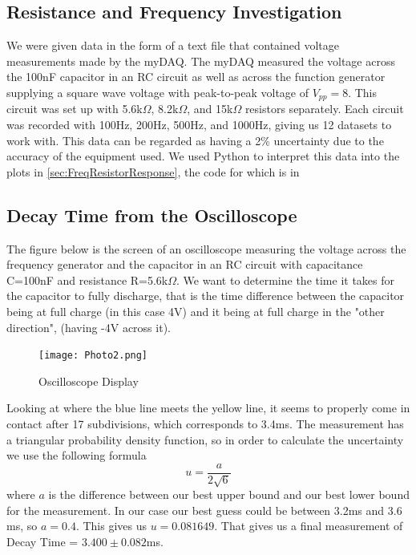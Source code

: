 \documentclass[12pt]{article}
\numberwithin{equation}{section}
\numberwithin{figure}{section}
\begin{document}
    \subsection{Resistance and Frequency Investigation}
    We were given data in the form of a text file that contained voltage measurements made by the myDAQ. 
    The myDAQ measured the voltage across the 100nF capacitor in an RC circuit as well as across the 
    function generator supplying a square wave voltage with peak-to-peak voltage of $V_{pp}=8$. This circuit 
    was set up with 5.6k$\Omega$, 8.2k$\Omega$, and 15k$\Omega$ resistors separately. Each circuit was 
    recorded with 100Hz, 200Hz, 500Hz, and 1000Hz, giving us 12 datasets to work with. This data can be 
    regarded as having a 2\% uncertainty due to the accuracy of the equipment used. We used Python to 
    interpret this data into the plots in \autoref{sec:FreqResistorResponse}, the code for which is in

    \subsection{Decay Time from the Oscilloscope}
    The figure below is the screen of an oscilloscope measuring the voltage across the frequency generator 
    and the capacitor in an RC circuit with capacitance C=100nF and resistance R=5.6k$\Omega$. We want to 
    determine the time it takes for the capacitor to fully discharge, that is the time difference between 
    the capacitor being at full charge (in this case 4V) and it being at full charge in the "other direction", 
    (having -4V across it).
    \begin{figure}[H]
        \begin{center}
           \texttt{[image: Photo2.png]}
           \caption{Oscilloscope Display}
           \label{fig:DecayTimeScreen}
        \end{center}
    \end{figure}
    Looking at where the blue line meets the yellow line, it seems to properly come in contact after 17 
    subdivisions, which corresponds to 3.4ms. The measurement has a triangular probability density function, 
    so in order to calculate the uncertainty we use the following formula
    \begin{equation}
        u=\frac{a}{2\sqrt{6}}
    \end{equation}
    where $a$ is the difference between our best upper bound and our best lower bound for the measurement. 
    In our case our best guess could be between 3.2ms and 3.6 ms, so $a=0.4$. This gives us $u=0.081649$.
    That gives us a final measurement of Decay Time = $3.400\pm 0.082$ms. 
\end{document}
